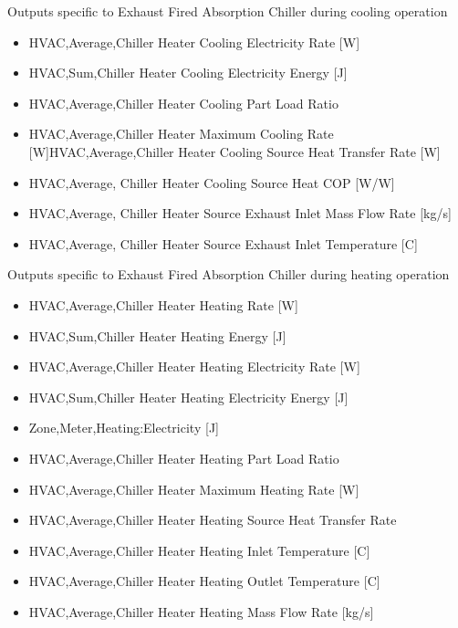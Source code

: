 Outputs specific to Exhaust Fired Absorption Chiller during cooling operation

\begin{itemize}
    \item
    HVAC,Average,Chiller Heater Cooling Electricity Rate {[}W{]}
    \item
    HVAC,Sum,Chiller Heater Cooling Electricity Energy {[}J{]}
    \item
    HVAC,Average,Chiller Heater Cooling Part Load Ratio
    \item
    HVAC,Average,Chiller Heater Maximum Cooling Rate {[}W{]}HVAC,Average,Chiller Heater Cooling Source Heat Transfer Rate {[}W{]}
    \item
    HVAC,Average, Chiller Heater Cooling Source Heat COP {[}W/W{]}
    \item
    HVAC,Average, Chiller Heater Source Exhaust Inlet Mass Flow Rate {[}kg/s{]}
    \item
    HVAC,Average, Chiller Heater Source Exhaust Inlet Temperature {[}C{]}
\end{itemize}

Outputs specific to Exhaust Fired Absorption Chiller during heating operation

\begin{itemize}
    \item
    HVAC,Average,Chiller Heater Heating Rate {[}W{]}
    \item
    HVAC,Sum,Chiller Heater Heating Energy {[}J{]}
    \item
    HVAC,Average,Chiller Heater Heating Electricity Rate {[}W{]}
    \item
    HVAC,Sum,Chiller Heater Heating Electricity Energy {[}J{]}
    \item
    Zone,Meter,Heating:Electricity {[}J{]}
    \item
    HVAC,Average,Chiller Heater Heating Part Load Ratio
    \item
    HVAC,Average,Chiller Heater Maximum Heating Rate {[}W{]}
    \item
    HVAC,Average,Chiller Heater Heating Source Heat Transfer Rate
    \item
    HVAC,Average,Chiller Heater Heating Inlet Temperature {[}C{]}
    \item
    HVAC,Average,Chiller Heater Heating Outlet Temperature {[}C{]}
    \item
    HVAC,Average,Chiller Heater Heating Mass Flow Rate {[}kg/s{]}
\end{itemize}

